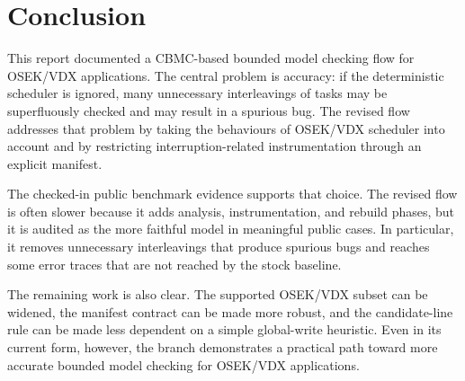 \section{Conclusion}
\label{sec:conclusion}

This report documented a CBMC-based bounded model checking flow for OSEK/VDX applications.
The central problem is accuracy: if the deterministic scheduler is ignored, many unnecessary
interleavings of tasks may be superfluously checked and may result in a spurious bug. The
revised flow addresses that problem by taking the behaviours of OSEK/VDX scheduler into
account and by restricting interruption-related instrumentation through an explicit manifest.

The checked-in public benchmark evidence supports that choice. The revised flow is often
slower because it adds analysis, instrumentation, and rebuild phases, but it is audited as the
more faithful model in meaningful public cases. In particular, it removes unnecessary
interleavings that produce spurious bugs and reaches some error traces that are not reached by
the stock baseline.

The remaining work is also clear. The supported OSEK/VDX subset can be widened, the manifest
contract can be made more robust, and the candidate-line rule can be made less dependent on a
simple global-write heuristic. Even in its current form, however, the branch demonstrates a
practical path toward more accurate bounded model checking for OSEK/VDX applications.
